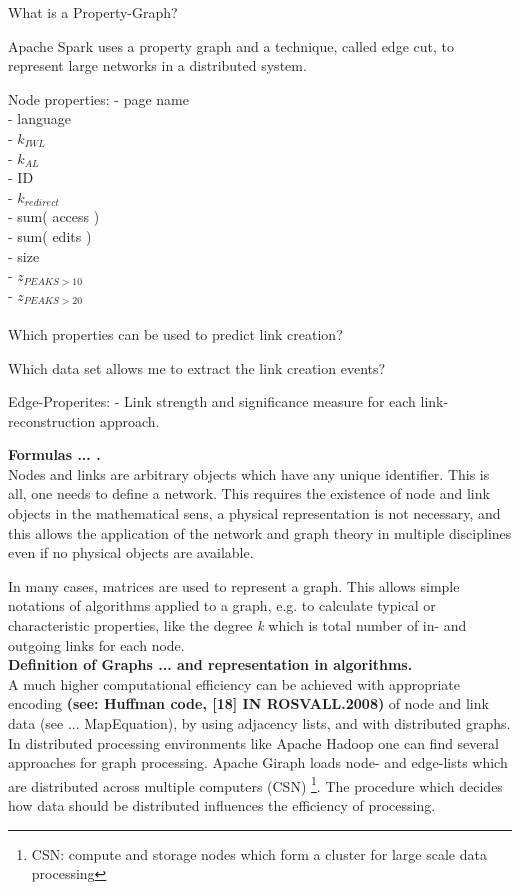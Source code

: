 \documentclass[a4paper,10pt]{scrbook}
\begin{document}
What is a Property-Graph?
\cite{Xin.2013}


\label{GraphX.PROPGRAPH.CUT}

Apache Spark uses a property graph and a technique, called edge cut, to represent large networks in a distributed system.

Node properties:
- page name\\
- language\\
- $k_{IWL}$\\
- $k_{AL}$\\
- ID\\
- $k_{redirect}$ \\
- sum( access )\\
- sum( edits )\\
- size \\
- $z_{PEAKS > 10}$\\
- $z_{PEAKS > 20}$\\
\\

Which properties can be used to predict link creation?

Which data set allows me to extract the link creation events?



Edge-Properites:
- Link strength and significance measure for each link-reconstruction approach.


\textbf{Formulas ... .}\\


Nodes and links are arbitrary objects which have any unique identifier. This is all, one needs to define a network. This requires the existence of node and link objects in the mathematical sens, a physical representation is not necessary, and this allows the application of the network and graph theory in multiple disciplines even if no physical objects are available.     

In many cases, matrices are used to represent a graph. This allows simple notations of algorithms applied to a graph, e.g. to calculate typical or characteristic properties, like the degree \textit{k} which is total number of in- and outgoing links for each node. \\

\textbf{Definition of Graphs ... and representation in algorithms.}\\

A much higher computational efficiency can be achieved with appropriate encoding \textbf{(see: Huffman code, [18] IN ROSVALL.2008)} of node and link data (see ... MapEquation), by using adjacency lists, and with distributed graphs. In distributed processing environments like Apache Hadoop one can find several approaches for graph processing. Apache Giraph \cite{Giraph} loads node- and edge-lists which are distributed across multiple computers (CSN) \footnote{CSN: compute and storage nodes which form a cluster for large scale data processing}. The procedure which decides how data should be distributed influences the efficiency of processing. 
\end{document}
